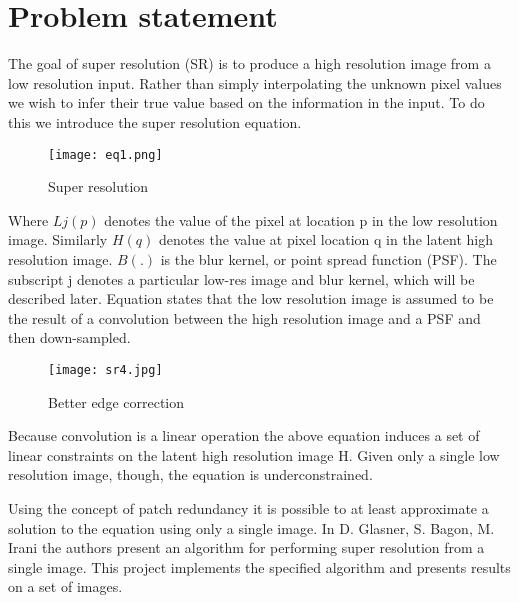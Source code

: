 \chapter{Problem statement}


The goal of super resolution (SR) is to produce a high resolution image from a low resolution input. Rather than simply interpolating the unknown pixel values we wish to infer their true value based on the information in the input. To do this we introduce the super resolution equation.

\begin{figure}[htb]
    \centering
    \texttt{[image: eq1.png]}
    \caption{Super resolution}
    \label{fig:eq1} %
\end{figure}


Where $Lj(p)$ denotes the value of the pixel at location p in the low resolution image. Similarly $H(q)$ denotes the value at pixel location q in the latent high resolution image. $B(.)$ is the blur kernel, or point spread function (PSF). The subscript j denotes a particular low-res image and blur kernel, which will be described later. Equation states that the low resolution image is assumed to be the result of a convolution between the high resolution image and a PSF and then down-sampled.

\begin{figure}[htb]
    \centering
    \texttt{[image: sr4.jpg]}
    \caption{Better edge correction}
    \label{fig:sr4} %
\end{figure}

Because convolution is a linear operation the above equation induces a set of linear constraints on the latent high resolution image H. Given only a single low resolution image, though, the equation is underconstrained.

Using the concept of patch redundancy it is possible to at least approximate a solution to the equation using only a single image. In D. Glasner, S. Bagon, M. Irani the authors present an algorithm for performing super resolution from a single image. This project implements the specified algorithm and presents results on a set of images.

